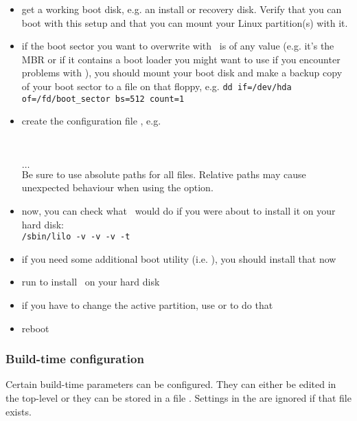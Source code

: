 \begin{itemize}
  \item get a working boot disk, e.g. an install or recovery disk. Verify that
    you can boot
    with this setup and that you can mount your Linux partition(s) with it.
  \item if the boot sector you want to overwrite with \LILO\ is of any value
    (e.g. it's the MBR or if it contains a boot loader you might want to use
    if you encounter problems with \LILO), you should mount your boot disk
    and make a backup copy of your boot sector to a file on that floppy,
    e.g. \verb"dd if=/dev/hda of=/fd/boot_sector bs=512 count=1"
  \item create the configuration file , e.g. \\
 \\
 \\
\verb"  " \\
$\ldots$ \\
    Be sure to use absolute paths for all files. Relative paths may cause
    unexpected behaviour when using the  option.
  \item now, you can check what \LILO\ would do if you were about to install
    it on your hard disk: \\
\verb"/sbin/lilo -v -v -v -t"
  \item if you need some additional boot utility (i.e. ), you
    should install that now
  \item run  to install \LILO\ on your hard disk
  \item if you have to change the active partition, use  or
     to do that
  \item reboot
\end{itemize}


\subsubsection{Build-time configuration}
\label{cfgmf}

Certain build-time parameters can be configured.
They can either be edited in the top-level  or they can be
stored in a file . Settings in the 
are ignored if that file exists.

